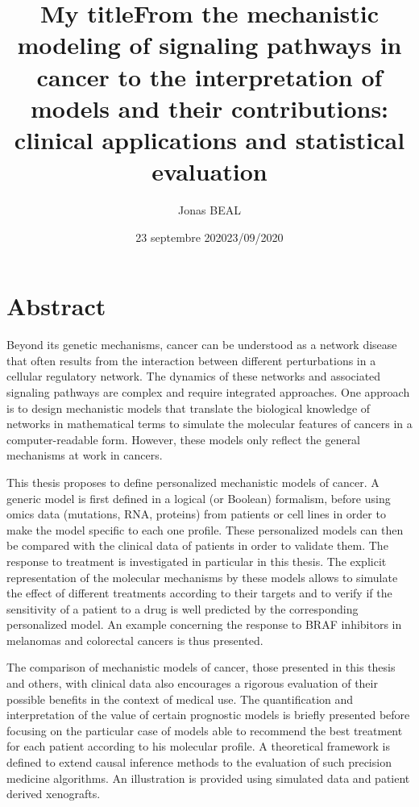 \documentclass[a4paper,12pt,twoside,onecolumn,openright,final,oldfontcommands]{memoir}
\title{My title}
\author{Jonas BEAL}
\institute{l'Institut Curie}
\institute{l'Institut Curie}
\date{23 septembre 2020}
\title{From the mechanistic modeling of signaling pathways in cancer to the
interpretation of models and their contributions: clinical applications
and statistical evaluation}
\date{23/09/2020}
\newcommand{\initial}[1]{
	\lettrine[lines=3,lhang=0.33,nindent=0em]{
		\color{gray}
     		{\textsc{#1}}}{}}
\begin{document}
\maketitle

\chapter*{Abstract}

\initial{B}eyond its genetic mechanisms, cancer can be understood as a
network disease that often results from the interaction between
different perturbations in a cellular regulatory network. The dynamics
of these networks and associated signaling pathways are complex and
require integrated approaches. One approach is to design mechanistic
models that translate the biological knowledge of networks in
mathematical terms to simulate the molecular features of cancers in a
computer-readable form. However, these models only reflect the general
mechanisms at work in cancers.

This thesis proposes to define personalized mechanistic models of
cancer. A generic model is first defined in a logical (or Boolean)
formalism, before using omics data (mutations, RNA, proteins) from
patients or cell lines in order to make the model specific to each one
profile. These personalized models can then be compared with the
clinical data of patients in order to validate them. The response to
treatment is investigated in particular in this thesis. The explicit
representation of the molecular mechanisms by these models allows to
simulate the effect of different treatments according to their targets
and to verify if the sensitivity of a patient to a drug is well
predicted by the corresponding personalized model. An example concerning
the response to BRAF inhibitors in melanomas and colorectal cancers is
thus presented.

The comparison of mechanistic models of cancer, those presented in this
thesis and others, with clinical data also encourages a rigorous
evaluation of their possible benefits in the context of medical use. The
quantification and interpretation of the value of certain prognostic
models is briefly presented before focusing on the particular case of
models able to recommend the best treatment for each patient according
to his molecular profile. A theoretical framework is defined to extend
causal inference methods to the evaluation of such precision medicine
algorithms. An illustration is provided using simulated data and patient
derived xenografts.
\end{document}
